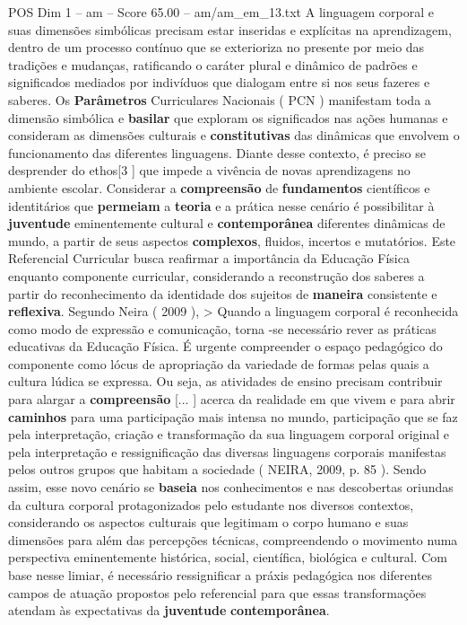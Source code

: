 \begin{textsample}{POS Dim 1 – am – Score 65.00 – am/am\_em\_13.txt}
A linguagem corporal e suas dimensões simbólicas precisam estar inseridas e explícitas na aprendizagem, dentro de um processo contínuo que se exterioriza no presente por meio das tradições e mudanças, ratificando o caráter plural e dinâmico de padrões e significados mediados por indivíduos que dialogam entre si nos seus fazeres e saberes.
Os \textbf{Parâmetros} Curriculares Nacionais ( PCN ) manifestam toda a dimensão simbólica e \textbf{basilar} que exploram os significados nas ações humanas e consideram as dimensões culturais e \textbf{constitutivas} das dinâmicas que envolvem o funcionamento das diferentes linguagens.
Diante desse contexto, é preciso se desprender do ethos[3 ] que impede a vivência de novas aprendizagens no ambiente escolar.
Considerar a \textbf{compreensão} de \textbf{fundamentos} científicos e identitários que \textbf{permeiam} a \textbf{teoria} e a prática nesse cenário é possibilitar à \textbf{juventude} eminentemente cultural e \textbf{contemporânea} diferentes dinâmicas de mundo, a partir de seus aspectos \textbf{complexos}, fluidos, incertos e mutatórios.
Este Referencial Curricular busca reafirmar a importância da Educação Física enquanto componente curricular, considerando a reconstrução dos saberes a partir do reconhecimento da identidade dos sujeitos de \textbf{maneira} consistente e \textbf{reflexiva}.
Segundo Neira ( 2009 ), > Quando a linguagem corporal é reconhecida como modo de expressão e comunicação, torna -se necessário rever as práticas educativas da Educação Física.
É urgente compreender o espaço pedagógico do componente como lócus de apropriação da variedade de formas pelas quais a cultura lúdica se expressa.
Ou seja, as atividades de ensino precisam contribuir para alargar a \textbf{compreensão} [... ] acerca da realidade em que vivem e para abrir \textbf{caminhos} para uma participação mais intensa no mundo, participação que se faz pela interpretação, criação e transformação da sua linguagem corporal original e pela interpretação e ressignificação das diversas linguagens corporais manifestas pelos outros grupos que habitam a sociedade ( NEIRA, 2009, p. 85 ).
Sendo assim, esse novo cenário se \textbf{baseia} nos conhecimentos e nas descobertas oriundas da cultura corporal protagonizados pelo estudante nos diversos contextos, considerando os aspectos culturais que legitimam o corpo humano e suas dimensões para além das percepções técnicas, compreendendo o movimento numa perspectiva eminentemente histórica, social, científica, biológica e cultural.
Com base nesse limiar, é necessário ressignificar a práxis pedagógica nos diferentes campos de atuação propostos pelo referencial para que essas transformações atendam às expectativas da \textbf{juventude} \textbf{contemporânea}.

\end{textsample}

